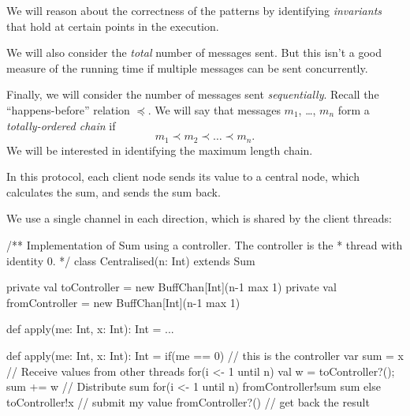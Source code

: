 \documentclass[notes,color]{sepslide0}
\begin{document}

\begin{slide}

We will reason about the correctness of the patterns by identifying
\emph{invariants} that hold at certain points in the execution.

We will also consider the \emph{total} number of messages sent.  But this
isn't a good measure of the running time if multiple messages can be sent
concurrently.

Finally, we will consider the number of messages sent \emph{sequentially}.
Recall the ``happens-before'' relation $\preceq$.  We will say that messages
$m_1$, \ldots, $m_n$ form a {\it totally-ordered chain} if
\[
m_1 \prec m_2 \prec \ldots \prec m_n.
\]
We will be interested in identifying the maximum length chain.
\end{slide}


\begin{slide}

In this protocol, each client node sends its value to a central node, which
calculates the sum, and sends the sum back.

We use a single channel in each direction, which is shared by the client
threads: 
%
\begin{scala}
/** Implementation of Sum using a controller.  The controller is the
  *  thread with identity 0. */
class Centralised(n: Int) extends Sum{
  private val toController = new BuffChan[Int](n-1 max 1)
  private val fromController = new BuffChan[Int](n-1 max 1)

  def apply(me: Int, x: Int): Int = ...
}
\end{scala}
\end{slide}


\begin{slide}

\begin{scala}
  def apply(me: Int, x: Int): Int = {
    if(me == 0){ // this is the controller
      var sum = x
      // Receive values from other threads
      for(i <- 1 until n){ val w = toController?(); sum += w }
      // Distribute sum
      for(i <- 1 until n) fromController!sum
      sum
    }
    else{
      toController!x     // submit my value
      fromController?() // get back the result
    }
  }
\end{scala}
\end{slide}
\end{document}
